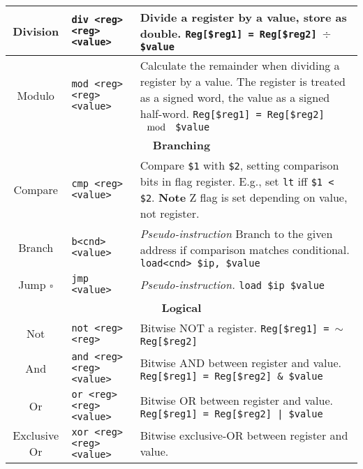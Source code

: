 \documentclass{article}
\begin{document}
\begin{longtable}{|c|l|l|}
    \hline
    Division & \texttt{div <reg> <reg> <value>} & \makecell[l]{Divide a register by a value, store as double.\\%
    \texttt{Reg[\$reg1] = Reg[\$reg2] \(\div\) \$value}} \\
    \hline
    Modulo & \texttt{mod <reg> <reg> <value>} & \makecell[l]{Calculate the remainder when dividing a register by a value.\\%
    The register is treated as a signed word, the value as a signed half-word.\\%
    \texttt{Reg[\$reg1] = Reg[\$reg2] \(\mod\) \$value}} \\
    \hline \hline
    \multicolumn{3}{|c|}{\textbf{Branching}} \\
    \hline
    Compare & \texttt{cmp <reg> <value>} & \makecell[l]{Compare \texttt{\$1} with \texttt{\$2}, setting comparison bits in flag register.\\%
    E.g., set \texttt{lt} iff \texttt{\$1 < \$2}.\\%
    \textbf{Note} Z flag is set depending on value, not register.} \\
    \hline
    Branch & \texttt{b<cnd> <value>} & \makecell[l]{\textit{Pseudo-instruction}\\%
    Branch to the given address if comparison matches conditional.\\%
    \texttt{load<cnd> \$ip, \$value}} \\
    \hline
    Jump \(\square\) & \texttt{jmp <value>} & \makecell[l]{\textit{Pseudo-instruction.}\\%
    \texttt{load \$ip \$value}} \\
    \hline \hline
    \multicolumn{3}{|c|}{\textbf{Logical}} \\
    \hline
    Not & \texttt{not <reg> <reg>} & \makecell[l]{Bitwise NOT a register.\\%
    \texttt{Reg[\$reg1] = \(\sim\) Reg[\$reg2]}} \\
    \hline
    And & \texttt{and <reg> <reg> <value>} & \makecell[l]{Bitwise AND between register and value.\\%
    \texttt{Reg[\$reg1] = Reg[\$reg2] \& \$value}} \\
    \hline
    Or & \texttt{or <reg> <reg> <value>} & \makecell[l]{Bitwise OR between register and value.\\%
    \texttt{Reg[\$reg1] = Reg[\$reg2] | \$value}} \\
    \hline
    Exclusive Or & \texttt{xor <reg> <reg> <value>} & \makecell[l]{Bitwise exclusive-OR between register and value.\\%
}
\end{longtable}
\end{document}
